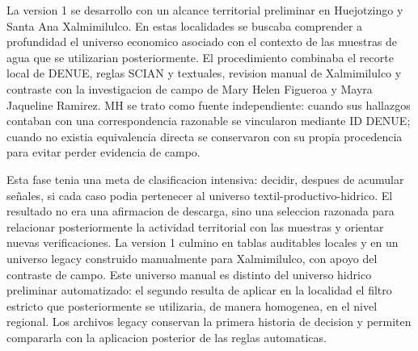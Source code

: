 \documentclass[11pt,letterpaper]{article}
\begin{document}
La version 1 se desarrollo con un alcance territorial preliminar en Huejotzingo y Santa Ana Xalmimilulco. En estas localidades se buscaba comprender a profundidad el universo economico asociado con el contexto de las muestras de agua que se utilizarian posteriormente. El procedimiento combinaba el recorte local de DENUE, reglas SCIAN y textuales, revision manual de Xalmimilulco y contraste con la investigacion de campo de Mary Helen Figueroa y Mayra Jaqueline Ramirez. MH se trato como fuente independiente: cuando sus hallazgos contaban con una correspondencia razonable se vincularon mediante ID DENUE; cuando no existia equivalencia directa se conservaron con su propia procedencia para evitar perder evidencia de campo.

Esta fase tenia una meta de clasificacion intensiva: decidir, despues de acumular señales, si cada caso podia pertenecer al universo textil-productivo-hidrico. El resultado no era una afirmacion de descarga, sino una seleccion razonada para relacionar posteriormente la actividad territorial con las muestras y orientar nuevas verificaciones. La version 1 culmino en tablas auditables locales y en un universo legacy construido manualmente para Xalmimilulco, con apoyo del contraste de campo. Este universo manual es distinto del universo hidrico preliminar automatizado: el segundo resulta de aplicar en la localidad el filtro estricto que posteriormente se utilizaria, de manera homogenea, en el nivel regional. Los archivos legacy conservan la primera historia de decision y permiten compararla con la aplicacion posterior de las reglas automaticas.
\end{document}

